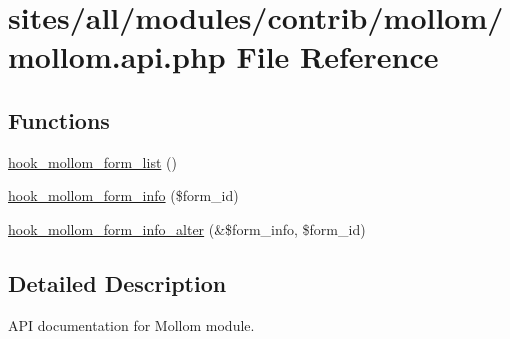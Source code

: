 \hypertarget{mollom_8api_8php}{
\section{sites/all/modules/contrib/mollom/mollom.api.php File Reference}
\label{mollom_8api_8php}
}
\subsection*{Functions}
\begin{CompactItemize}
\item 
\hyperlink{group__mollom__api_gdd309b0309f638d79b17a686ea96f564}{hook\_\-mollom\_\-form\_\-list} ()
\item 
\hyperlink{group__mollom__api_ga5150fd4fabe048cbdeb41ec10908658}{hook\_\-mollom\_\-form\_\-info} (\$form\_\-id)
\item 
\hyperlink{group__mollom__api_gd0e440366ce3bd86317641b94693cbe6}{hook\_\-mollom\_\-form\_\-info\_\-alter} (\&\$form\_\-info, \$form\_\-id)
\end{CompactItemize}


\subsection{Detailed Description}
API documentation for Mollom module. 